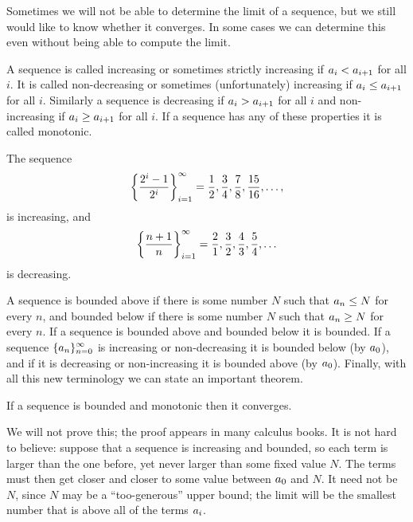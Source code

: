 Sometimes we will not be able to determine the limit of a sequence,
but we still would like to know whether it converges. In some cases we
can determine this even without being able to compute the limit.

A sequence is called {\dfont increasing\/}
or sometimes {\dfont strictly increasing\/} if $\displaystyle a_i<a_{i+1}$ for all
$i$. It is called {\dfont
non-decreasing\/} or sometimes
(unfortunately) {\dfont increasing\/} if $\displaystyle a_i\le a_{i+1}$ for all
$i$. Similarly a sequence is {\dfont
decreasing\/} if $\displaystyle a_i>a_{i+1}$ for all $i$
and {\dfont non-increasing\/} if
$\displaystyle a_i\ge a_{i+1}$ for all $i$. If a sequence has any of these
properties it is called {\dfont monotonic\/}.

\begin{example}
The sequence
$$
  \left\{{2^i-1\over2^i}\right\}_{i=1}^\infty=
  {1\over2},{3\over4},{7\over8},{15\over16},\ldots,
$$
is increasing, and
$$ 
  \left\{{n+1\over n}\right\}_{i=1}^\infty=
  {2\over1},{3\over2},{4\over3},{5\over4},\ldots
$$
is decreasing.
\end{example}

A sequence is {\dfont bounded above\/}
if there is some number $N$ such that $\displaystyle a_n\le N$ for every $n$,
and {\dfont bounded below\/} if there is
some number $N$ such that $\displaystyle a_n\ge N$ for every $n$. If a sequence
is bounded above and bounded below it is {\dfont
bounded\/}. If a sequence $\displaystyle
\{a_n\}_{n=0}^\infty$ is increasing or non-decreasing it is bounded
below (by $\displaystyle a_0$), and if it is decreasing or non-increasing it is
bounded above (by $\displaystyle a_0$).  Finally, with all this new terminology
we can state an important theorem.

\begin{theorem} If a sequence is bounded and monotonic then it converges.
\end{theorem}

We will not prove this; the proof appears in many calculus books. It
is not hard to believe: suppose that a sequence is increasing and
bounded, so each term is larger than the one before, yet never larger
than some fixed value $N$. The terms must then get closer and closer
to some value between $\displaystyle a_0$ and $N$. It need not be $N$, since $N$ may
be a ``too-generous'' upper bound; the limit will be the
smallest number that is above all of the terms $\displaystyle a_i$.

